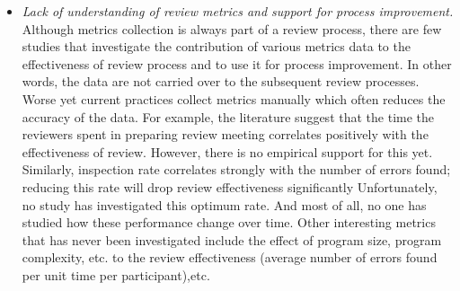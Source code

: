 \begin {itemize}
\item {\sl Lack of understanding of review metrics and support for
process improvement.} 
  Although metrics collection is always part of a review process, 
  there are few studies that investigate the contribution of various
  metrics data to the effectiveness of review process and to use it
  for process improvement. In other words, the data are not carried
  over to the subsequent review processes.
 Worse yet current practices collect metrics manually
  which often reduces the accuracy of the data.
  For example, the literature \cite{Gilb88,Humphrey90} suggest that the time the reviewers
  spent in preparing review meeting correlates positively with the
  effectiveness of review.  However, there is no empirical support for
  this yet. Similarly, inspection rate correlates strongly with the
  number of errors found; reducing this rate will drop review
  effectiveness significantly \cite{Gilb88} Unfortunately, no study
  has investigated this optimum rate. And most of all, no one has
  studied how these performance change over time.
  Other interesting metrics that has never been investigated
  include the effect of program size, program complexity, etc. to
  the review effectiveness (average number of errors found per unit
  time  per participant),etc. 
\end {itemize}


